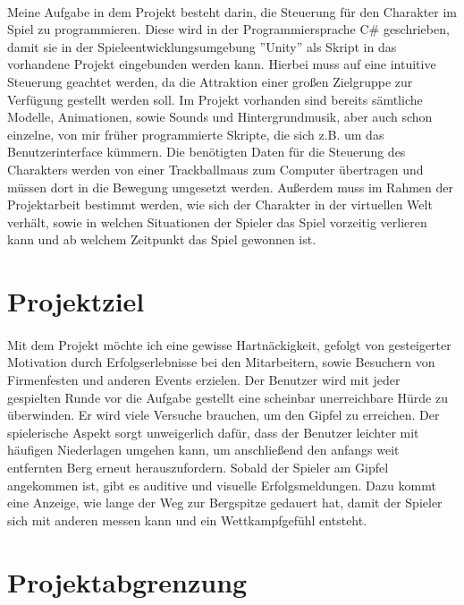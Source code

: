 \paragraph{}
Meine Aufgabe in dem Projekt besteht darin, die Steuerung für den Charakter im Spiel zu programmieren. Diese wird in der Programmiersprache C\# geschrieben, damit sie in der Spieleentwicklungsumgebung ”Unity” als Skript in das vorhandene Projekt eingebunden werden kann. Hierbei muss auf eine intuitive Steuerung geachtet werden, da die Attraktion einer großen Zielgruppe zur Verfügung gestellt werden soll. Im Projekt vorhanden sind bereits sämtliche Modelle, Animationen, sowie Sounds und Hintergrundmusik, aber auch schon einzelne, von mir früher programmierte Skripte, die sich z.B. um das Benutzerinterface kümmern. Die benötigten Daten für die Steuerung des Charakters werden von einer Trackballmaus zum Computer übertragen und müssen dort in die Bewegung umgesetzt werden. Außerdem muss im Rahmen der Projektarbeit bestimmt werden, wie sich der Charakter in der virtuellen Welt verhält, sowie in welchen Situationen der Spieler das Spiel vorzeitig verlieren kann und ab welchem Zeitpunkt das Spiel gewonnen ist.

\section{Projektziel}
\paragraph{}
Mit dem Projekt möchte ich eine gewisse Hartnäckigkeit, gefolgt von gesteigerter Motivation durch Erfolgserlebnisse bei den Mitarbeitern, sowie Besuchern von Firmenfesten und anderen Events erzielen. Der Benutzer wird mit jeder gespielten Runde vor die Aufgabe gestellt eine scheinbar unerreichbare Hürde zu überwinden. Er wird viele Versuche brauchen, um den Gipfel zu erreichen. Der spielerische Aspekt sorgt unweigerlich dafür, dass der Benutzer leichter mit häufigen Niederlagen umgehen kann, um anschließend den anfangs weit entfernten Berg erneut herauszufordern. Sobald der Spieler am Gipfel angekommen ist, gibt es auditive und visuelle Erfolgsmeldungen. Dazu kommt eine Anzeige, wie lange der Weg zur Bergspitze gedauert hat, damit der Spieler sich mit anderen messen kann und ein Wettkampfgefühl entsteht.

\section{Projektabgrenzung}
\label{Projektabgrenzung}

